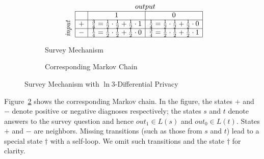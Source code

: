 \begin{figure}
  \centering
  \begin{subfigure}{.48\columnwidth}
      \[
      \begin{array}{c|c|c|c|}
        \multicolumn{2}{c}{} &
        \multicolumn{2}{c}{output}
        \\
        \cline{2-4}
        &  & 1 & 0 \\
        \cline{2-4}
        \multirow{2}*{\rotatebox{90}{$\mathit{input}$}} 
        &
        + & \frac{3}{4} = \frac{1}{2} \cdot \frac{1}{2} + \frac{1}{2} \cdot 1
          & \frac{1}{4} = \frac{1}{2} \cdot \frac{1}{2} + \frac{1}{2} \cdot 0
        \\
        \cline{2-4}
        &
        - & \frac{1}{4} = \frac{1}{2} \cdot \frac{1}{2} + \frac{1}{2} \cdot 0
          & \frac{3}{4} = \frac{1}{2} \cdot \frac{1}{2} + \frac{1}{2} \cdot 1
        \\
        \cline{2-4}
      \end{array}
      \]
    \caption{Survey Mechanism}
    \label{figure:2-dp-table}
  \end{subfigure}
  \hspace{.05\columnwidth}
  \begin{subfigure}{.40\columnwidth}
    \caption{Corresponding Markov Chain}
    \label{figure:2-dp-mdp}
  \end{subfigure}
  \caption{Survey Mechanism with $\ln 3$-Differential Privacy}
  \label{figure:2-dp}
\end{figure}

Figure~\ref{figure:2-dp-mdp} shows the corresponding Markov chain.
In the figure, the states
$+$ and $-$ denote positive or negative diagnoses 
respectively; the states $s$ and $t$ denote answers to the survey
question and hence $\mathit{out}_1 \in L (s)$ and $\mathit{out}_0
\in L (t)$.
States $+$ and $-$ are neighbors.
Missing transitions (such as those from $s$ and $t$) lead
to a special state $\dagger$ with a self-loop. We omit such transitions
and the state $\dagger$ for clarity.


